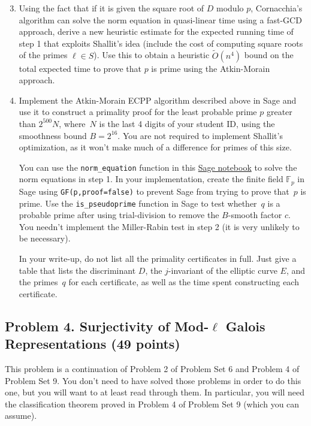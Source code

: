 \documentclass[11pt]{article}
\newcommand{\Fp}{\mathbb{F}_p}
\newcommand{\softO}{\widetilde{O}}
\begin{document}
\begin{enumerate}[{\bf (a)}]
\setcounter{enumi}{2}
\item Using the fact that if it is given the square root of $D$ modulo $p$, Cornacchia's algorithm can solve the norm equation in quasi-linear time using a fast-GCD approach, derive a new heuristic estimate for the expected running time of step 1 that exploits Shallit's idea (include the cost of computing square roots of the primes $\ell \in S$).
Use this to obtain a heuristic $\softO(n^4)$ bound on the total expected time to prove that $p$ is prime using the Atkin-Morain approach.
\item Implement the Atkin-Morain ECPP algorithm described above in Sage and use it to construct a primality proof for the least probable prime $p$ greater than $2^{500}N$, where~$N$ is the last 4 digits of your student ID, using the smoothness bound $B=2^{16}$.  You are not required to implement Shallit's optimization, as it won't make much of a difference for primes of this size.

You can use the \texttt{norm\_equation} function in this \href{https://cocalc.com/share/public_paths/4283f59e7b759b1779c3a6689ed086de9b425835}{Sage notebook} to solve the norm equations in step 1.
In your implementation, create the finite field $\Fp$ in Sage using \texttt{GF(p,proof=false)} to prevent Sage from trying to prove that~$p$ is prime.
Use the \texttt{is\_pseudoprime} function in Sage to test whether~$q$ is a probable prime after using trial-division to remove the $B$-smooth factor $c$.  You needn't implement the Miller-Rabin test in step 2 (it is very unlikely to be necessary).

In your write-up, do not list all the primality certificates in full.
Just give a table that lists the discriminant $D$, the $j$-invariant of the elliptic curve $E$, and the primes~$q$ for each certificate, as well as the time spent constructing each certificate.
\end{enumerate}

\subsection*{Problem 4. Surjectivity of Mod-$\ell$ Galois Representations (49 points)}

This problem is a continuation of Problem 2 of Problem Set 6 and Problem 4 of Problem Set 9.  You don't need to have solved those problems in order to do this one, but you will want to at least read through them.  In particular, you will need the classification theorem proved in Problem 4 of Problem Set 9 (which you can assume).
\end{document}
